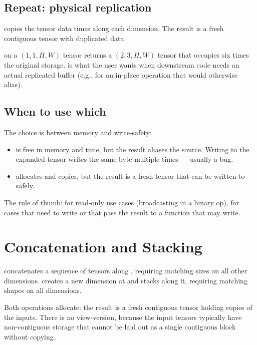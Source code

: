 \subsection{Repeat: physical replication}
\label{ssec:shape_view:repeat_physical}

 copies the tensor data  times along
each dimension. The result is a fresh contiguous tensor with
duplicated data.

 on a $(1, 1, H, W)$ tensor returns a
$(2, 3, H, W)$ tensor that occupies six times the original
storage.  is what the user wants when downstream code
needs an actual replicated buffer (e.g., for an in-place operation
that would otherwise alias).

\subsection{When to use which}
\label{ssec:shape_view:expand_vs_repeat}

The choice is between memory and write-safety:

\begin{itemize}
  \item {} is free in memory and time, but the result
    aliases the source. Writing to the expanded tensor writes the
    same byte multiple times --- usually a bug.
  \item {} allocates and copies, but the result is a
    fresh tensor that can be written to safely.
\end{itemize}

The rule of thumb:  for read-only use cases
(broadcasting in a binary op),  for cases that need
to write or that pass the result to a function that may write.

\section{Concatenation and Stacking}
\label{sec:shape_view:concat}

 concatenates a sequence of tensors along
, requiring matching sizes on all other dimensions.
 creates a new dimension at 
and stacks along it, requiring matching shapes on all dimensions.

Both operations allocate: the result is a fresh contiguous tensor
holding copies of the inputs. There is no view-version, because
the input tensors typically have non-contiguous storage that
cannot be laid out as a single contiguous block without copying.

